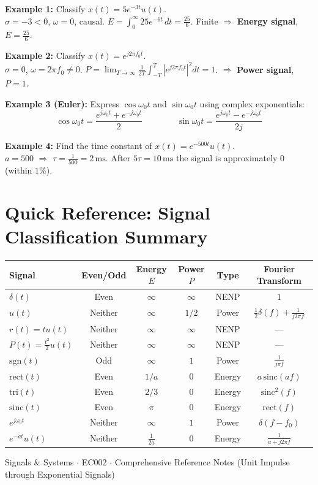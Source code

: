 \documentclass[10pt,a4paper]{article}
\begin{document}
\begin{exbox}
\textbf{Example 1:} Classify $x(t) = 5e^{-3t}u(t)$.\\
$\sigma=-3<0$, $\omega=0$, causal. $E=\int_0^\infty 25e^{-6t}\,dt=\tfrac{25}{6}$. Finite $\Rightarrow$ \textbf{Energy signal}, $E=\tfrac{25}{6}$.

\medskip
\textbf{Example 2:} Classify $x(t)=e^{j2\pi f_0 t}$.\\
$\sigma=0$, $\omega=2\pi f_0\neq0$. $P=\lim_{T\to\infty}\tfrac{1}{2T}\int_{-T}^{T}|e^{j2\pi f_0t}|^2dt=1$. $\Rightarrow$ \textbf{Power signal}, $P=1$.

\medskip
\textbf{Example 3 (Euler):} Express $\cos\omega_0 t$ and $\sin\omega_0 t$ using complex exponentials:
\[
  \cos\omega_0 t = \frac{e^{j\omega_0 t}+e^{-j\omega_0 t}}{2} \qquad\qquad \sin\omega_0 t = \frac{e^{j\omega_0 t}-e^{-j\omega_0 t}}{2j}
\]

\textbf{Example 4:} Find the time constant of $x(t)=e^{-500t}u(t)$.\\
$a=500$ $\Rightarrow$ $\tau=\tfrac{1}{500}=2\,\mathrm{ms}$. After $5\tau=10\,\mathrm{ms}$ the signal is approximately $0$ (within $1\%$).
\end{exbox}

\section{Quick Reference: Signal Classification Summary}

\begin{center}
{\small
\begin{tabular}{@{}l c c c c c@{}}
\toprule
\textbf{Signal} & \textbf{Even/Odd} & \textbf{Energy $E$} & \textbf{Power $P$} & \textbf{Type} & \textbf{Fourier Transform} \\
\midrule
$\delta(t)$ & Even & $\infty$ & $\infty$ & NENP & $1$ \\
$u(t)$ & Neither & $\infty$ & $1/2$ & Power & $\tfrac{1}{2}\delta(f)+\tfrac{1}{j2\pi f}$ \\
$r(t)=tu(t)$ & Neither & $\infty$ & $\infty$ & NENP & --- \\
$P(t)=\tfrac{t^2}{2}u(t)$ & Neither & $\infty$ & $\infty$ & NENP & --- \\
$\text{sgn}(t)$ & Odd & $\infty$ & $1$ & Power & $\tfrac{1}{j\pi f}$ \\
$\text{rect}(t)$ & Even & $1/a$ & $0$ & Energy & $a\,\text{sinc}(af)$ \\
$\text{tri}(t)$ & Even & $2/3$ & $0$ & Energy & $\text{sinc}^2(f)$ \\
$\text{sinc}(t)$ & Even & $\pi$ & $0$ & Energy & $\text{rect}(f)$ \\
$e^{j\omega_0 t}$ & Neither & $\infty$ & $1$ & Power & $\delta(f-f_0)$ \\
$e^{-at}u(t)$ & Neither & $\tfrac{1}{2a}$ & $0$ & Energy & $\tfrac{1}{a+j2\pi f}$ \\
\bottomrule
\end{tabular}
}
\end{center}

\vspace{6pt}
\begin{center}
{\small\color{gray}
Signals \& Systems $\cdot$ EC002 $\cdot$ Comprehensive Reference Notes (Unit Impulse through Exponential Signals)
}
\end{center}
\end{document}
